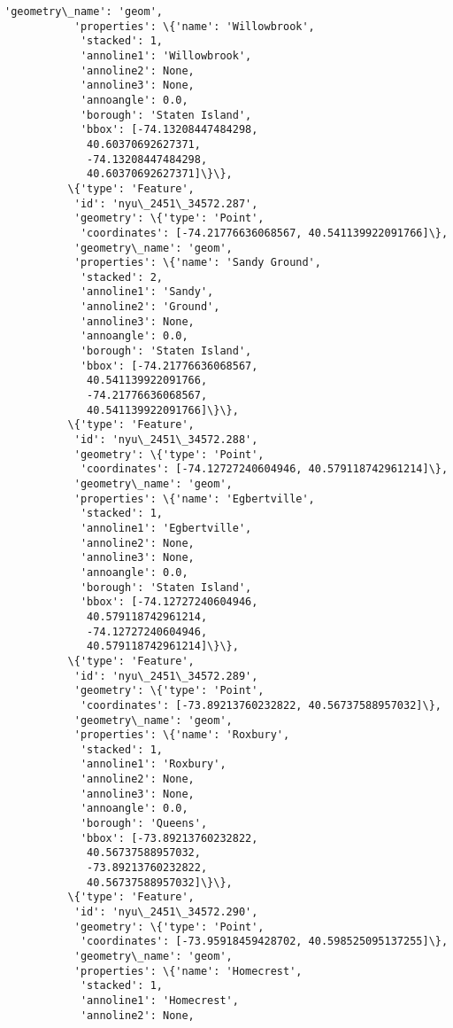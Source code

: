 \documentclass[11pt]{article}
\begin{document}
\begin{Verbatim}[commandchars=\\\{\}]
           'geometry\_name': 'geom',
           'properties': \{'name': 'Willowbrook',
            'stacked': 1,
            'annoline1': 'Willowbrook',
            'annoline2': None,
            'annoline3': None,
            'annoangle': 0.0,
            'borough': 'Staten Island',
            'bbox': [-74.13208447484298,
             40.60370692627371,
             -74.13208447484298,
             40.60370692627371]\}\},
          \{'type': 'Feature',
           'id': 'nyu\_2451\_34572.287',
           'geometry': \{'type': 'Point',
            'coordinates': [-74.21776636068567, 40.541139922091766]\},
           'geometry\_name': 'geom',
           'properties': \{'name': 'Sandy Ground',
            'stacked': 2,
            'annoline1': 'Sandy',
            'annoline2': 'Ground',
            'annoline3': None,
            'annoangle': 0.0,
            'borough': 'Staten Island',
            'bbox': [-74.21776636068567,
             40.541139922091766,
             -74.21776636068567,
             40.541139922091766]\}\},
          \{'type': 'Feature',
           'id': 'nyu\_2451\_34572.288',
           'geometry': \{'type': 'Point',
            'coordinates': [-74.12727240604946, 40.579118742961214]\},
           'geometry\_name': 'geom',
           'properties': \{'name': 'Egbertville',
            'stacked': 1,
            'annoline1': 'Egbertville',
            'annoline2': None,
            'annoline3': None,
            'annoangle': 0.0,
            'borough': 'Staten Island',
            'bbox': [-74.12727240604946,
             40.579118742961214,
             -74.12727240604946,
             40.579118742961214]\}\},
          \{'type': 'Feature',
           'id': 'nyu\_2451\_34572.289',
           'geometry': \{'type': 'Point',
            'coordinates': [-73.89213760232822, 40.56737588957032]\},
           'geometry\_name': 'geom',
           'properties': \{'name': 'Roxbury',
            'stacked': 1,
            'annoline1': 'Roxbury',
            'annoline2': None,
            'annoline3': None,
            'annoangle': 0.0,
            'borough': 'Queens',
            'bbox': [-73.89213760232822,
             40.56737588957032,
             -73.89213760232822,
             40.56737588957032]\}\},
          \{'type': 'Feature',
           'id': 'nyu\_2451\_34572.290',
           'geometry': \{'type': 'Point',
            'coordinates': [-73.95918459428702, 40.598525095137255]\},
           'geometry\_name': 'geom',
           'properties': \{'name': 'Homecrest',
            'stacked': 1,
            'annoline1': 'Homecrest',
            'annoline2': None,

\end{Verbatim}
\end{document}
